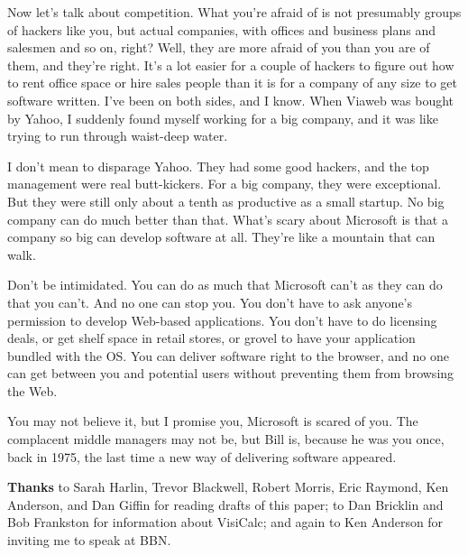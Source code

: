 Now let's talk about competition. What you're afraid of is not
presumably groups of hackers like you, but actual companies, with
offices and business plans and salesmen and so on, right? Well, they are
more afraid of you than you are of them, and they're right. It's a lot
easier for a couple of hackers to figure out how to rent office space or
hire sales people than it is for a company of any size to get software
written. I've been on both sides, and I know. When Viaweb was bought by
Yahoo, I suddenly found myself working for a big company, and it was
like trying to run through waist-deep water.

I don't mean to disparage Yahoo. They had some good hackers, and the top
management were real butt-kickers. For a big company, they were
exceptional. But they were still only about a tenth as productive as a
small startup. No big company can do much better than that. What's scary
about Microsoft is that a company so big can develop software at all.
They're like a mountain that can walk.

Don't be intimidated. You can do as much that Microsoft can't as they
can do that you can't. And no one can stop you. You don't have to ask
anyone's permission to develop Web-based applications. You don't have to
do licensing deals, or get shelf space in retail stores, or grovel to
have your application bundled with the OS. You can deliver software
right to the browser, and no one can get between you and potential users
without preventing them from browsing the Web.

You may not believe it, but I promise you, Microsoft is scared of you.
The complacent middle managers may not be, but Bill is, because he was
you once, back in 1975, the last time a new way of delivering software
appeared.


\textbf{Thanks} to Sarah Harlin, Trevor Blackwell, Robert Morris, Eric
Raymond, Ken Anderson, and Dan Giffin for reading drafts of this paper;
to Dan Bricklin and Bob Frankston for information about VisiCalc; and
again to Ken Anderson for inviting me to speak at BBN.